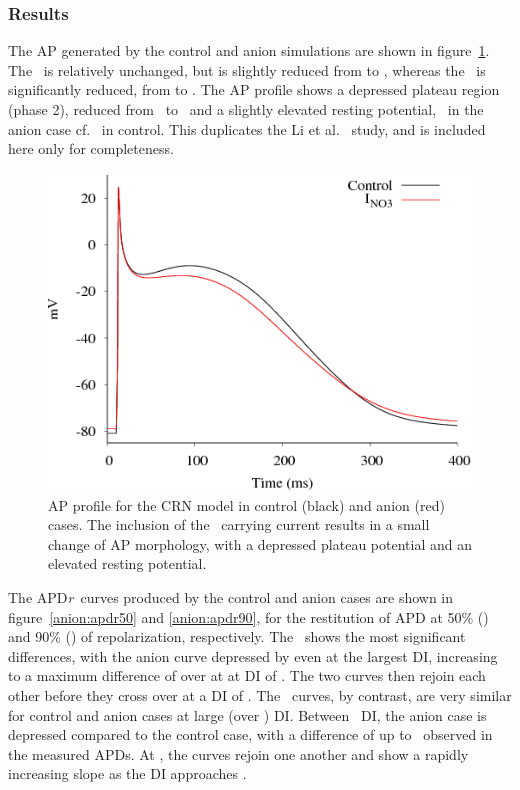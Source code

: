 \subsubsection{Results}

The AP generated by the control and anion simulations are shown in
figure~\ref{anion:ap}.  The \apd\ is relatively unchanged, but is slightly
reduced from  to , whereas the \apd[50]\ is significantly
reduced, from  to .  The AP profile shows a depressed plateau region (phase
2), reduced from \ to \ and a slightly elevated resting potential,
\ in the anion case cf. \ in control.  This duplicates the Li et
al.~\cite{li2007} study, and is included here only for completeness.

\begin{figure}
\includegraphics{figures/toolkit/anion/01_AP}
\caption[Anion Sensitive AP Profile]{\label{anion:ap} AP profile for the CRN
model in control (black) and anion (red) cases.  The inclusion of the
\nothree\ carrying current results in a small change of AP morphology, with
a depressed plateau potential and an elevated resting potential.}
\end{figure}

The APD\emph{r}\ curves produced by the control and anion cases are shown in
figure~\ref{anion:apdr50} and \ref{anion:apdr90}, for the restitution of APD at
50\% (\apdr[50]) and 90\% (\apdr) of repolarization, respectively.  The
\apdr[50]\ shows the most significant differences, with the anion
curve depressed by  even at the largest DI, increasing to a maximum
difference of over  at at DI of .  The two curves then rejoin each
other before they cross over at a DI of .  The \apdr\ curves, by
contrast, are very similar for control and anion cases at large (over ) DI.
Between \ DI, the anion case is depressed compared to the control
case, with a difference of up to \ observed in the measured APDs.  At
, the curves rejoin one another and show a rapidly increasing slope as the
DI approaches .

